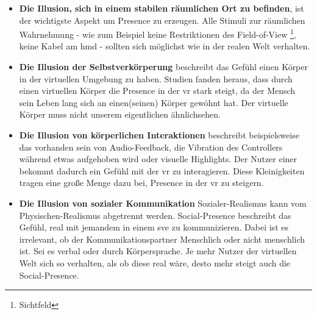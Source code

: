 \documentclass[a4paper,11pt]{article}%
\renewcommand{\\}{\vspace*{0.5\baselineskip} \newline}
\begin{document}
\begin{itemize}
	\item{\textbf{Die Illusion, sich in einem stabilen räumlichen Ort zu befinden}}, ist der wichtigste Aspekt um Presence zu erzeugen. Alle Stimuli zur räumlichen Wahrnehmung - wie zum Beispiel keine Restriktionen des \dq{}Field-of-View\dq{} \footnote{Sichtfeld}, keine Kabel am \ac{hmd} - sollten sich möglichst wie in der realen Welt verhalten. \citep[p.47]{jerald2015vr}
	\item{\textbf{Die Illusion der Selbstverkörperung}} beschreibt das Gefühl einen Körper in der virtuellen Umgebung zu haben. Studien fanden heraus, dass durch einen virtuellen Körper die \dq{}Presence\dq{} in der \ac{vr} stark steigt, da der Mensch sein Leben lang sich an einen(seinen) Körper gewöhnt hat. \citep[p.756]{botvinick1998rubber} Der virtuelle Körper muss nicht unserem eigentlichen ähnlichsehen. \citep[p.7]{maxwell1960psycho}
	\item{\textbf{Die Illusion von körperlichen Interaktionen}} beschreibt beispielsweise das vorhanden sein von Audio-Feedback, die Vibration des Controllers während etwas aufgehoben wird oder visuelle Highlights. Der Nutzer einer bekommt dadurch ein Gefühl mit der \ac{vr} zu interagieren. Diese Kleinigkeiten tragen eine große Menge dazu bei, \dq{}Presence \dq{} in der \ac{vr} zu steigern. \citep[p.48]{jerald2015vr}
	\item{\textbf{Die Illusion von sozialer Kommunikation}} Sozialer-Realismus kann vom Physischen-Realismus abgetrennt werden. \dq{}Social-Presence\dq{} beschreibt das Gefühl, real mit jemandem in einem \ac{sve} zu kommunizieren. Dabei ist es irrelevant, ob der Kommunikationspartner Menschlich oder nicht menschlich ist. Sei es verbal oder durch Körpersprache. Je mehr Nutzer der virtuellen Welt sich so verhalten, als ob diese real wäre, desto mehr steigt auch die \dq{}Social-Presence\dq{}. \citep[p.49]{jerald2015vr} \citep[p.12]{guadagno2007virtual}
\end{itemize}

\end{document}
